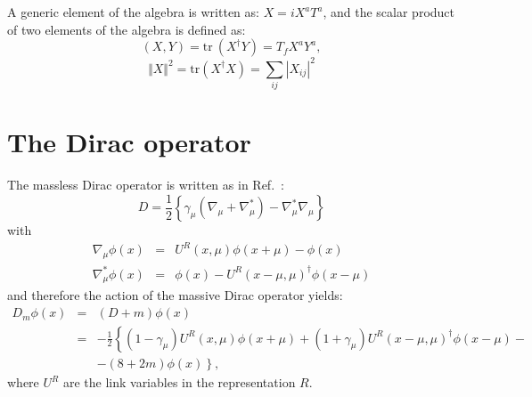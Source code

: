 \documentclass{article}[12pt]
\begin{document}
\noindent
A generic element of the algebra is written as: $X=i X^a T^a$, and the
scalar product of two elements of the algebra is defined as:
%
\begin{equation}
(X,Y)= \mathrm{tr\ } \left(X^\dagger Y\right) = T_f X^a Y^a,
\end{equation}
%
\begin{equation}
\Vert X \Vert^2 = \mathrm{tr } \left(X^\dagger X\right)
 = \sum_{ij} \left| X_{ij} \right|^2
\end{equation}

\section{The Dirac operator}
The massless Dirac operator is written as in Ref.~\cite{Luscher:1996sc}:
%
\begin{equation}
D = \frac12 \left\{\gamma_\mu \left(\nabla_\mu + \nabla^*_\mu \right) 
- \nabla^*_\mu \nabla_\mu \right\}
\end{equation}
%
with
%
\begin{eqnarray}
\nabla_\mu\phi(x) &=& U^R (x,\mu)\phi(x+\mu) - \phi(x) \\
\nabla_\mu^*\phi(x) &=& \phi(x) - U^R (x-\mu,\mu)^\dagger\phi(x-\mu)
\end{eqnarray}
%
and therefore the action of the massive Dirac operator yields:
%
\begin{eqnarray}
D_m \phi(x) &=& (D+m) \phi(x) \nonumber \\
&=& - \frac12 \left\{ \left(1-\gamma_\mu\right) U^R(x,\mu) \phi(x+\mu) +
\left(1+\gamma_\mu\right) U^R(x-\mu,\mu)^\dagger \phi(x-\mu) - \right. 
\nonumber \\
& & \left. -(8+2m) \phi(x) \right\}, \label{DM}
\end{eqnarray}
%
where $U^R$ are the link variables in the representation $R$.
\end{document}

